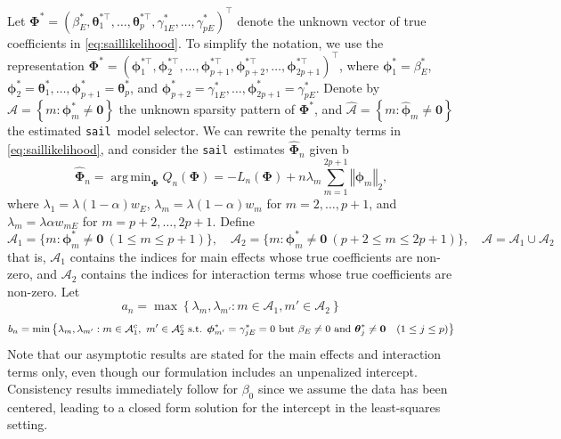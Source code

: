 \documentclass[a4paper,fleqn]{cas-sc}
\newcommand{\ddd}{,\ldots,}
\newcommand{\sail}{\texttt{sail}}
\newcommand{\btheta}{\boldsymbol{\theta}}
\DeclareMathOperator*{\argmin}{arg\,min}
\newcommand{\A}{\mathcal{A}}
\begin{document}
{\normalsize{}Let $\boldsymbol{\Phi}^{*}=(\beta_{E}^{*},\btheta_{1}^{*\top},\ldots,\btheta_{p}^{*\top},\gamma_{1E}^{*},\ldots,\gamma_{pE}^{*})^{\top}$
	denote the unknown vector of true coefficients in \eqref{eq:saillikelihood}.
	To simplify the notation, we use the representation $\boldsymbol{\Phi}^{*}=(\boldsymbol{\phi}_{1}^{*\top},\boldsymbol{\phi}_{2}^{*\top},\ldots,\boldsymbol{\phi}_{p+1}^{*\top},\boldsymbol{\phi}_{p+2}^{*\top},\ldots,\boldsymbol{\phi}_{2p+1}^{*\top})^{\top}$,
	where $\boldsymbol{\phi}_{1}^{*}=\beta_{E}^{*}$, $\boldsymbol{\phi}_{2}^{*}=\boldsymbol{\theta}_{1}^{*}\ddd\boldsymbol{\phi}_{p+1}^{*}=\boldsymbol{\theta}_{p}^{*}$,
	and $\boldsymbol{\phi}_{p+2}^{*}=\gamma_{1E}^{*}\ddd\boldsymbol{\phi}_{2p+1}^{*}=\gamma_{pE}^{*}$.
	Denote by $\A=\left\lbrace m:\boldsymbol{\phi}_{m}^{*}\neq\mathbf{0}\right\rbrace $
	the unknown sparsity pattern of $\boldsymbol{\Phi}^{*}$, and $\widehat{\A}=\left\lbrace m:\widehat{\boldsymbol{\phi}}_{m}\neq\mathbf{0}\right\rbrace $
	the estimated \sail ~model selector. We can rewrite the penalty terms
	in \eqref{eq:saillikelihood}, and consider the \sail ~estimates $\widehat{\boldsymbol{\Phi}}_{n}$
	given b
	\begin{equation}
	\widehat{\boldsymbol{\Phi}}_{n}=\argmin_{\boldsymbol{\Phi}}Q_{n}(\boldsymbol{\Phi})=-L_{n}(\boldsymbol{\Phi})+n\lambda_{m}\sum_{m=1}^{2p+1}\left\Vert \boldsymbol{\phi}_{m}\right\Vert _{2},
	\end{equation}
	where $\lambda_{1}=\lambda(1-\alpha)w_{E}$, $\lambda_{m}=\lambda(1-\alpha)w_{m}$
	for $m=2,\ldots,p+1$, and $\lambda_{m}=\lambda\alpha w_{mE}$ for
	$m=p+2,\ldots,2p+1$. Define 
	\[
	\A_{1}=\{m:\boldsymbol{\phi}_{m}^{*}\neq\mathbf{0}\ (1\leq m\leq p+1)\},\quad\A_{2}=\{m:\boldsymbol{\phi}_{m}^{*}\neq\mathbf{0}\ (p+2\leq m\leq2p+1)\},\quad\A=\A_{1}\cup\A_{2}
	\]
	that is, $\A_{1}$ contains the indices for main effects whose true
	coefficients are non-zero, and $\A_{2}$ contains the indices for interaction
	terms whose true coefficients are non-zero. Let 
	\[
	a_{n}=\max\left\lbrace \lambda_{m},\lambda_{m'}:m\in\A_{1},m'\in\A_{2}\right\rbrace 
	\]
	\[
	b_{n}=\min\left\lbrace \lambda_{m},\lambda_{m'}:m\in\A_{1}^{c},\ m'\in\A_{2}^{c}\text{ s.t. }\text{\ensuremath{\boldsymbol{\phi}_{m'}^{*}}}=\gamma_{jE}^{*}=0\text{ but }\beta_{E}\neq0\text{ and }\btheta_{j}^{*}\neq\mathbf{0}\quad(1\leq j\leq p)\right\rbrace 
	\]
	Note that our asymptotic results are stated for the main effects and
	interaction terms only, even though our formulation includes an unpenalized
	intercept. Consistency results immediately follow for $\beta_{0}$
	since we assume the data has been centered, leading to a closed form
	solution for the intercept in the least-squares setting.}{\normalsize\par}
\end{document}
